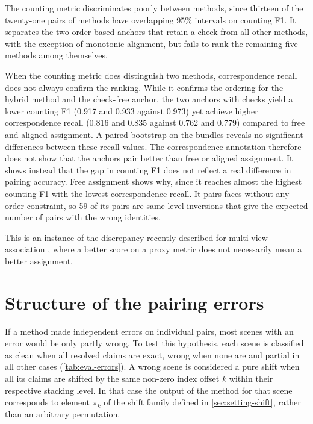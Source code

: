 \documentclass[a4paper, 12pt, twoside]{book}
\newcommand{\citev}[1]{\citeauthor{#1} \citeyear{#1} \cite{#1}}
\begin{document}
The counting metric discriminates poorly between methods, since thirteen of the twenty-one pairs of methods have overlapping 95\% intervals on counting F1. It separates the two order-based anchors that retain a check from all other methods, with the exception of monotonic alignment, but fails to rank the remaining five methods among themselves.

When the counting metric does distinguish two methods, correspondence recall does not always confirm the ranking. While it confirms the ordering for the hybrid method and the check-free anchor, the two anchors with checks yield a lower counting F1 (0.917 and 0.933 against 0.973) yet achieve higher correspondence recall (0.816 and 0.835 against 0.762 and 0.779) compared to free and aligned assignment. A paired bootstrap on the bundles reveals no significant differences between these recall values. The correspondence annotation therefore does not show that the anchors pair better than free or aligned assignment. It shows instead that the gap in counting F1 does not reflect a real difference in pairing accuracy. Free assignment shows why, since it reaches almost the highest counting F1 with the lowest correspondence recall. It pairs faces without any order constraint, so 59 of its pairs are same-level inversions that give the expected number of pairs with the wrong identities.

This is an instance of the discrepancy recently described for multi-view association \citev{shelukhan2026}, where a better score on a proxy metric does not necessarily mean a better assignment.

\section{Structure of the pairing errors}
\label{sec:eval-errors}

If a method made independent errors on individual pairs, most scenes with an error would be only partly wrong. To test this hypothesis, each scene is classified as clean when all resolved claims are exact, wrong when none are and partial in all other cases (\cref{tab:eval-errors}). A wrong scene is considered a pure shift when all its claims are shifted by the same non-zero index offset $k$ within their respective stacking level. In that case the output of the method for that scene corresponds to element $\pi_k$ of the shift family defined in \cref{sec:setting-shift}, rather than an arbitrary permutation.
\end{document}
